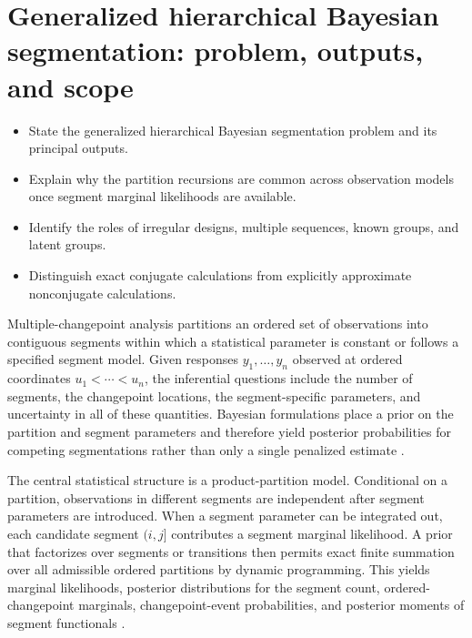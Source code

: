 \chapter[Orientation and scope]{Generalized hierarchical Bayesian segmentation: problem, outputs, and scope}
\label{ch:orientation}

\begin{objectives}
\begin{itemize}
\item State the generalized hierarchical Bayesian segmentation problem and its principal outputs.
\item Explain why the partition recursions are common across observation models once segment marginal likelihoods are available.
\item Identify the roles of irregular designs, multiple sequences, known groups, and latent groups.
\item Distinguish exact conjugate calculations from explicitly approximate nonconjugate calculations.
\end{itemize}
\end{objectives}

Multiple-changepoint analysis partitions an ordered set of observations into contiguous segments
within which a statistical parameter is constant or follows a specified segment model. Given
responses $y_1,\ldots,y_n$ observed at ordered coordinates $u_1<\cdots<u_n$, the inferential
questions include the number of segments, the changepoint locations, the segment-specific
parameters, and uncertainty in all of these quantities. Bayesian formulations place a prior on the
partition and segment parameters and therefore yield posterior probabilities for competing
segmentations rather than only a single penalized estimate \citep{barry1992ppm,barry1993bayesCP,
fearnhead2006exact,hutter2006bpcr}.

The central statistical structure is a product-partition model. Conditional on a partition,
observations in different segments are independent after segment parameters are introduced. When a
segment parameter can be integrated out, each candidate segment $(i,j]$ contributes a segment
marginal likelihood. A prior that factorizes over segments or transitions then permits exact finite
summation over all admissible ordered partitions by dynamic programming. This yields marginal
likelihoods, posterior distributions for the segment count, ordered-changepoint marginals,
changepoint-event probabilities, and posterior moments of segment functionals
\citep{barry1992ppm,fearnhead2006exact,hutter2006bpcr}.

